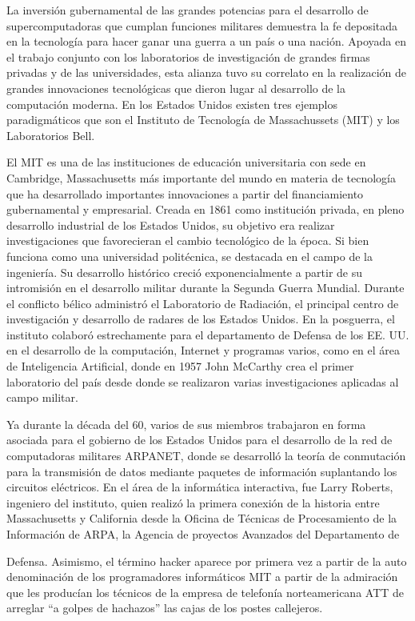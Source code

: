 \documentclass[
  letterpaper,
  DIV=11,
  numbers=noendperiod]{scrreprt}
\begin{document}
La inversión gubernamental de las grandes potencias para el desarrollo
de supercomputadoras que cumplan funciones militares demuestra la fe
depositada en la tecnología para hacer ganar una guerra a un país o una
nación. Apoyada en el trabajo conjunto con los laboratorios de
investigación de grandes firmas privadas y de las universidades, esta
alianza tuvo su correlato en la realización de grandes innovaciones
tecnológicas que dieron lugar al desarrollo de la computación moderna.
En los Estados Unidos existen tres ejemplos paradigmáticos que son el
Instituto de Tecnología de Massachussets (MIT) y los Laboratorios Bell.

El MIT es una de las instituciones de educación universitaria con sede
en Cambridge, Massachusetts más importante del mundo en materia de
tecnología que ha desarrollado importantes innovaciones a partir del
financiamiento gubernamental y empresarial. Creada en 1861 como
institución privada, en pleno desarrollo industrial de los Estados
Unidos, su objetivo era realizar investigaciones que favorecieran el
cambio tecnológico de la época. Si bien funciona como una universidad
politécnica, se destacada en el campo de la ingeniería. Su desarrollo
histórico creció exponencialmente a partir de su intromisión en el
desarrollo militar durante la Segunda Guerra Mundial. Durante el
conflicto bélico administró el Laboratorio de Radiación, el principal
centro de investigación y desarrollo de radares de los Estados Unidos.
En la posguerra, el instituto colaboró estrechamente para el
departamento de Defensa de los EE. UU. en el desarrollo de la
computación, Internet y programas varios, como en el área de
Inteligencia Artificial, donde en 1957 John McCarthy crea el primer
laboratorio del país desde donde se realizaron varias investigaciones
aplicadas al campo militar.

Ya durante la década del 60, varios de sus miembros trabajaron en forma
asociada para el gobierno de los Estados Unidos para el desarrollo de la
red de computadoras militares ARPANET, donde se desarrolló la teoría de
conmutación para la transmisión de datos mediante paquetes de
información suplantando los circuitos eléctricos. En el área de la
informática interactiva, fue Larry Roberts, ingeniero del instituto,
quien realizó la primera conexión de la historia entre Massachusetts y
California desde la Oficina de Técnicas de Procesamiento de la
Información de ARPA, la Agencia de proyectos Avanzados del Departamento
de

Defensa. Asimismo, el término hacker aparece por primera vez a partir de
la auto denominación de los programadores informáticos MIT a partir de
la admiración que les producían los técnicos de la empresa de telefonía
norteamericana ATT de arreglar ``a golpes de hachazos'' las cajas de los
postes callejeros.
\end{document}
